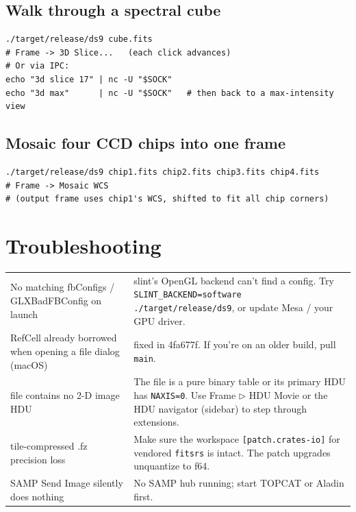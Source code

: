 \documentclass[11pt,a4paper]{article}
\begin{document}
\subsection*{Walk through a spectral cube}

\begin{lstlisting}[language=shell]
./target/release/ds9 cube.fits
# Frame -> 3D Slice...   (each click advances)
# Or via IPC:
echo "3d slice 17" | nc -U "$SOCK"
echo "3d max"      | nc -U "$SOCK"   # then back to a max-intensity view
\end{lstlisting}

\subsection*{Mosaic four CCD chips into one frame}

\begin{lstlisting}[language=shell]
./target/release/ds9 chip1.fits chip2.fits chip3.fits chip4.fits
# Frame -> Mosaic WCS
# (output frame uses chip1's WCS, shifted to fit all chip corners)
\end{lstlisting}

\section{Troubleshooting}

\begin{tabular}{@{}p{}p{}@{}}
\toprule
\textsf{No matching fbConfigs / GLXBadFBConfig} on launch &
slint's OpenGL backend can't find a config. Try
\texttt{SLINT\_BACKEND=software ./target/release/ds9}, or update Mesa /
your GPU driver. \\
\textsf{RefCell already borrowed} when opening a file dialog (macOS) &
fixed in 4fa677f. If you're on an older build, pull \texttt{main}. \\
\textsf{file contains no 2-D image HDU} &
The file is a pure binary table or its primary HDU has \texttt{NAXIS=0}.
Use \textsf{Frame $\triangleright$ HDU Movie} or the HDU navigator
(sidebar) to step through extensions. \\
\textsf{tile-compressed .fz precision loss} &
Make sure the workspace \texttt{[patch.crates-io]} for vendored
\texttt{fitsrs} is intact. The patch upgrades unquantize to f64. \\
\textsf{SAMP Send Image silently does nothing} &
No SAMP hub running; start TOPCAT or Aladin first. \\
\bottomrule
\end{tabular}
\end{document}
